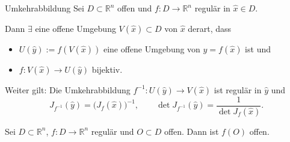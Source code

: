 \begin{satz}{Umkehrabbildung}
    Sei $D \subset \mathbb{R}^n$ offen und $f\colon D \to \mathbb{R}^n$ regulär in $\hat{x}\in D$.

    Dann $\exists$ eine offene Umgebung $V(\hat{x}) \subset D$ von $\hat{x}$ derart, dass
    \begin{itemize}
        \item $U(\hat{y}):=f(V(\hat{x}))$ eine offene Umgebung von $\hat{y}=f(\hat{x})$ ist und
        \item $f\colon V(\hat{x}) \to U(\hat{y})$ bijektiv.
    \end{itemize}

    Weiter gilt: Die Umkehrabbildung $f^{-1}\colon U(\hat{y}) \to V(\hat{x})$ ist regulär in $\hat{y}$ und
    $$
    J_{f^{-1}}(\hat{y}) = \bigl(J_f(\hat{x})\bigr)^{-1}, \qquad
    \det J_{f^{-1}}(\hat{y}) = \frac{1}{\det J_f(\hat{x})}.
    $$ 
\end{satz}

\begin{korollar}{}
    Sei $D\subset\mathbb{R}^n$, $f\colon D\to\mathbb{R}^n$ regulär und $O\subset D$ offen. Dann ist $f(O)$ offen.
\end{korollar}